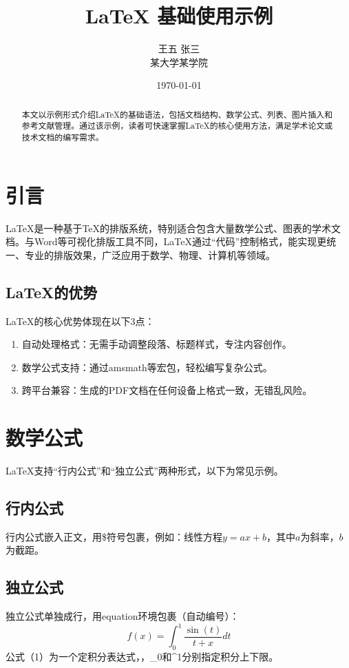 \documentclass[12pt,a4paper]{article}
\title{LaTeX 基础使用示例}
\author{王五 \quad 张三 \\ 某大学某学院}  %
\date{\today}  %
\begin{document}
\maketitle

\begin{abstract}
本文以示例形式介绍LaTeX的基础语法，包括文档结构、数学公式、列表、图片插入和参考文献管理。通过该示例，读者可快速掌握LaTeX的核心使用方法，满足学术论文或技术文档的编写需求。
\end{abstract}

\tableofcontents
\clearpage  %

\section{引言}
LaTeX是一种基于TeX的排版系统，特别适合包含大量数学公式、图表的学术文档。与Word等可视化排版工具不同，LaTeX通过“代码”控制格式，能实现更统一、专业的排版效果，广泛应用于数学、物理、计算机等领域。

\subsection{LaTeX的优势}
LaTeX的核心优势体现在以下3点：
\begin{enumerate}[1.]  %
    \item 自动处理格式：无需手动调整段落、标题样式，专注内容创作。
    \item 数学公式支持：通过amsmath等宏包，轻松编写复杂公式。
    \item 跨平台兼容：生成的PDF文档在任何设备上格式一致，无错乱风险。
\end{enumerate}

\section{数学公式}
LaTeX支持“行内公式”和“独立公式”两种形式，以下为常见示例。

\subsection{行内公式}
行内公式嵌入正文，用\$符号包裹，例如：线性方程\( y = ax + b \)，其中\( a \)为斜率，\( b \)为截距。

\subsection{独立公式}
独立公式单独成行，用equation环境包裹（自动编号）：
\begin{equation}  %
    f(x) = \int_{0}^{1} \frac{\sin(t)}{t + x} dt
\end{equation}
公式（1）为一个定积分表达式，，_{0}和^{1}分别指定积分上下限。
\end{document}

